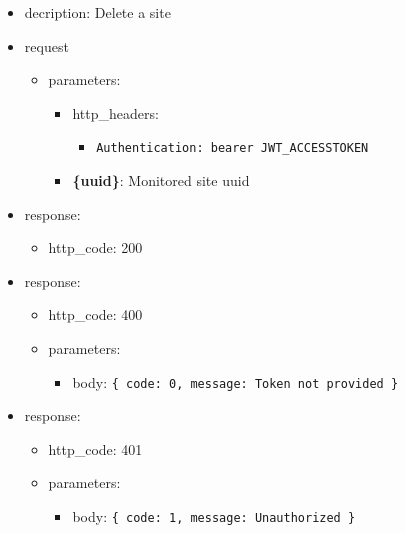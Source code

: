 \documentclass[
]{article}
\begin{document}
\begin{itemize}
\item
  decription: Delete a site
\item
  request

  \begin{itemize}
  \item
    parameters:

    \begin{itemize}
    \item
      http\_headers:

      \begin{itemize}
      \item
        \texttt{Authentication:\ \textquotesingle{}bearer\ JWT\_ACCESSTOKEN\textquotesingle{}}
      \end{itemize}
    \item
      \textbf{\{uuid\}}: Monitored site uuid
    \end{itemize}
  \end{itemize}
\item
  response:

  \begin{itemize}
  \item
    http\_code: 200
  \end{itemize}
\item
  response:

  \begin{itemize}
  \item
    http\_code: 400
  \item
    parameters:

    \begin{itemize}
    \item
      body: \texttt{\{
      \textquotesingle{}code\textquotesingle{}:\ 0,\ 
      \textquotesingle{}message\textquotesingle{}:\ \textquotesingle{}Token\ not\ provided\textquotesingle{}
      \}}
    \end{itemize}
  \end{itemize}
\item
  response:

  \begin{itemize}
  \item
    http\_code: 401
  \item
    parameters:

    \begin{itemize}
    \item
      body: \texttt{\{
      \textquotesingle{}code\textquotesingle{}:\ 1,\ 
      \textquotesingle{}message\textquotesingle{}:\ \textquotesingle{}Unauthorized\textquotesingle{}
      \}}
    \end{itemize}
  \end{itemize}
\end{itemize}
\end{document}
